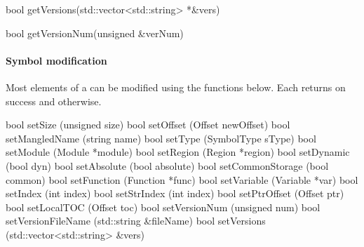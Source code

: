 \begin{apient}
bool getVersions(std::vector<std::string> *&vers)
\end{apient}

\begin{apient}
bool getVersionNum(unsigned &verNum)
\end{apient}

\paragraph{Symbol modification}

Most elements of a  can be modified using the functions below. Each returns  on success and  otherwise. 

\begin{apient}
bool setSize (unsigned size)
bool setOffset (Offset newOffset)
bool setMangledName (string name)
bool setType (SymbolType sType)
bool setModule (Module *module)
bool setRegion (Region *region)
bool setDynamic (bool dyn)
bool setAbsolute (bool absolute)
bool setCommonStorage (bool common) 
bool setFunction (Function *func)
bool setVariable (Variable *var)
bool setIndex (int index)
bool setStrIndex (int index)
bool setPtrOffset (Offset ptr)
bool setLocalTOC (Offset toc)
bool setVersionNum (unsigned num)
bool setVersionFileName (std::string &fileName)
bool setVersions (std::vector<std::string> &vers)
\end{apient}
